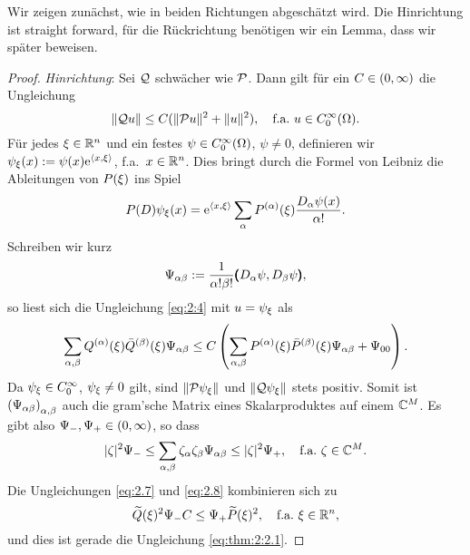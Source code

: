 Wir zeigen zunächst, wie in beiden Richtungen abgeschätzt wird.
Die Hinrichtung ist straight forward,
für die Rückrichtung benötigen wir ein Lemma,
dass wir später beweisen.

\begin{proof}
{\em Hinrichtung}:
Sei $\mathcal Q$ schwächer wie $\mathcal P$.
Dann gilt für ein $C\in(0,\infty)$ die Ungleichung
\begin{equation}\label{eq:2:4}
\lVert\mathcal Q u\rVert\leq C(\lVert\mathcal P u\rVert^2+\lVert u\rVert^2),\quad\text{f.a.}~u\in C^\infty_0(\Omega).
\end{equation}
Für jedes $\xi\in\mathbb R^n$ und ein festes $\psi\in C^\infty_0(\Omega)$, $\psi\neq0$,
definieren wir $\psi_\xi(x):=\psi(x)\mathrm e^{\langle x,\xi\rangle}$, f.a.~$x\in\mathbb R^n$.
Dies bringt durch die Formel von Leibniz die Ableitungen von $P(\xi)$ ins Spiel
\begin{equation}\label{eq:2.5}
P(D)\psi_\xi(x)=\mathrm e^{\langle x,\xi\rangle}\sum_\alpha P^{(\alpha)}(\xi)\frac{D_\alpha\psi(x)}{\alpha!}.
\end{equation}
Schreiben wir kurz
\begin{equation}\label{eq:2.6}
\Psi_{\alpha\beta}:=\frac1{\alpha!\beta!}\pmb(D_\alpha\psi,D_\beta\psi\pmb),
\end{equation}
so liest sich die Ungleichung \eqref{eq:2:4} mit $u=\psi_\xi$ als
\begin{equation}\label{eq:2.7}
\sum_{\alpha,\beta}Q^{(\alpha)}(\xi)\bar{Q}^{(\beta)}(\xi)\Psi_{\alpha\beta}
\leq C\left(\sum_{\alpha,\beta}P^{(\alpha)}(\xi)\bar{P}^{(\beta)}(\xi)\Psi_{\alpha\beta}+\Psi_{00}\right).
\end{equation}
Da $\psi_\xi\in C^\infty_0$, $\psi_\xi\neq0$ gilt, sind $\lVert\mathcal P\psi_\xi\rVert$ und $\lVert\mathcal Q\psi_\xi\rVert$ stets positiv.
Somit ist $\left(\Psi_{\alpha\beta}\right)_{\alpha,\beta}$ auch die gram'sche Matrix
eines Skalarproduktes auf einem $\mathbb C^M$.
Es gibt also $\Psi_-,\Psi_+\in(0,\infty)$, so dass
\begin{equation}\label{eq:2.8}
\lvert\zeta\rvert^2\Psi_-\leq\sum_{\alpha,\beta}\zeta_\alpha\zeta_\beta\Psi_{\alpha\beta}\leq\lvert\zeta\rvert^2\Psi_+,
\quad\text{f.a.}~\zeta\in\mathbb C^M.
\end{equation}
Die Ungleichungen \eqref{eq:2.7} und \eqref{eq:2.8} kombinieren sich zu
\begin{equation}\label{eq:2.9}
\widetilde{Q}(\xi)^2\Psi_-C\leq\Psi_+\widetilde{P}(\xi)^2,
\quad\text{f.a.}~\xi\in\mathbb R^n,
\end{equation}
und dies ist gerade die Ungleichung \eqref{eq:thm:2:2.1}.


\end{proof}
